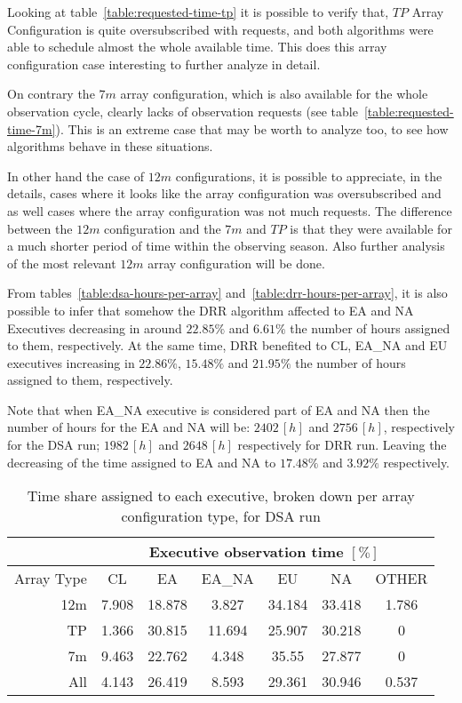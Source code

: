 Looking at table~\ref{table:requested-time-tp} it is possible to verify that, $TP$ Array Configuration is quite oversubscribed with requests, and both algorithms were able to schedule almost the whole available time. This does this array configuration case interesting to further analyze in detail. 

On contrary the $7m$ array configuration, which is also available for the whole observation cycle, clearly lacks of observation requests (see table~\ref{table:requested-time-7m}). This is an extreme case that may be worth to analyze too, to see how algorithms behave in these situations.

In other hand the case of $12m$ configurations, it is possible to appreciate, in the details, cases where it looks like the array configuration was oversubscribed and as well cases where the array configuration was not much requests. The difference between the $12m$ configuration and the $7m$ and $TP$ is that they were available for a much shorter period of time within the observing season. Also further analysis of the most relevant $12m$ array configuration will be done.

From tables~\ref{table:dsa-hours-per-array} and~\ref{table:drr-hours-per-array}, it is also possible to infer that somehow the DRR algorithm affected to EA and NA Executives decreasing in around $22.85\%$ and $6.61\%$ the number of hours assigned to them, respectively. At the same time, DRR benefited to CL, EA\_NA and EU executives increasing in $22.86\%$, $15.48\%$ and $21.95\%$ the number of hours assigned to them, respectively.

Note that when EA\_NA executive is considered part of EA and NA then the number of hours for the EA and NA will be: $2402\,[h]$ and $2756\,[h]$, respectively for the DSA run; $1982\,[h]$ and $2648\,[h]$ respectively for DRR run. Leaving the decreasing of the time assigned to EA and NA to $17.48\%$ and $3.92\%$ respectively.  

\begin{table}[t]
\centering
\begin{tabular}{c|c|c|c|c|c|c|} 
\cline{2-7}
 & \multicolumn{6}{c|}{Executive observation time $[\%]$} \\ \hline
\multicolumn{1}{|r|}{Array Type} & CL	& EA & EA\_NA &	EU & NA & OTHER \\ \hline
\multicolumn{1}{|r|}{12m} & 7.908 & 18.878 & 3.827 & 34.184 & 33.418 & 1.786 \\ \hline
\multicolumn{1}{|r|}{TP} & 1.366 & 30.815 & 11.694 & 25.907 & 30.218 & 0 \\ \hline
\multicolumn{1}{|r|}{7m} & 9.463 & 22.762 & 4.348 & 35.55 & 27.877 & 0 \\ \hline
\multicolumn{1}{|r|}{All} & 4.143 & 26.419 & 8.593 & 29.361 & 30.946 & 0.537 \\ \hline
\end{tabular}
\caption{Time share assigned to each executive, broken down per array configuration type, for DSA run}
\label{table:dsa-percentage-per-array}
\end{table}

